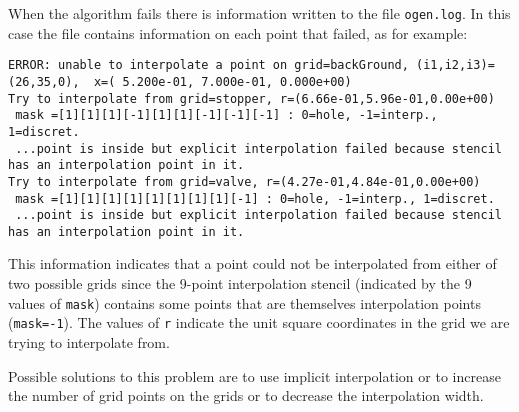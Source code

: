 \documentclass[xcolor=rgb,svgnames,dvipsnames]{article}
\begin{document}
When the algorithm fails there is information written to the file {\tt ogen.log}. In this case the
file contains information on each point that failed, as for example:
{\footnotesize
\begin{verbatim}
ERROR: unable to interpolate a point on grid=backGround, (i1,i2,i3)=(26,35,0),  x=( 5.200e-01, 7.000e-01, 0.000e+00) 
Try to interpolate from grid=stopper, r=(6.66e-01,5.96e-01,0.00e+00)
 mask =[1][1][1][-1][1][1][-1][-1][-1] : 0=hole, -1=interp., 1=discret.
 ...point is inside but explicit interpolation failed because stencil has an interpolation point in it.
Try to interpolate from grid=valve, r=(4.27e-01,4.84e-01,0.00e+00)
 mask =[1][1][1][1][1][1][1][1][-1] : 0=hole, -1=interp., 1=discret.
 ...point is inside but explicit interpolation failed because stencil has an interpolation point in it.
\end{verbatim}
} 
This information indicates that a point could not be interpolated
from either of two possible grids since the 9-point interpolation
stencil (indicated by the 9 values of {\tt mask}) contains some points
that are themselves interpolation points ({\tt mask=-1}). The values of {\tt r} indicate the
unit square coordinates in the grid we are trying to interpolate from.


Possible solutions to this problem are to use implicit interpolation or to increase the number of grid points
on the grids or to decrease the interpolation width.
\end{document}
